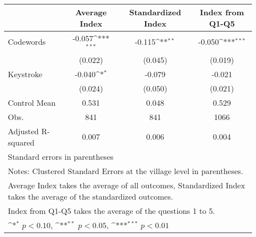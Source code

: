 {
\def\sym#1{\ifmmode^{#1}\else\(^{#1}\)\fi}
\begin{tabular}{l*{3}{c}}
\toprule
                &\multicolumn{1}{c}{Average Index}&\multicolumn{1}{c}{Standardized Index}&\multicolumn{1}{c}{Index from Q1-Q5}\\
\midrule
Codewords       &   -0.057\sym{***}&   -0.115\sym{**} &   -0.050\sym{***}\\
                &  (0.022)         &  (0.045)         &  (0.019)         \\
Keystroke       &   -0.040\sym{*}  &   -0.079         &   -0.021         \\
                &  (0.024)         &  (0.050)         &  (0.021)         \\
\midrule
Control Mean    &    0.531         &    0.048         &    0.529         \\
Obs.            &      841         &      841         &     1066         \\
Adjusted R-squared&    0.007         &    0.006         &    0.004         \\
\bottomrule
\multicolumn{4}{l}{\footnotesize Standard errors in parentheses}\\
\multicolumn{4}{l}{\footnotesize Notes: Clustered Standard Errors at the village level in parentheses.}\\
\multicolumn{4}{l}{\footnotesize Average Index takes the average of all outcomes, Standardized Index takes the average of the standardized outcomes.}\\
\multicolumn{4}{l}{\footnotesize Index from Q1-Q5 takes the average of the questions 1 to 5.}\\
\multicolumn{4}{l}{\footnotesize \sym{*} \(p<0.10\), \sym{**} \(p<0.05\), \sym{***} \(p<0.01\)}\\
\end{tabular}
}
